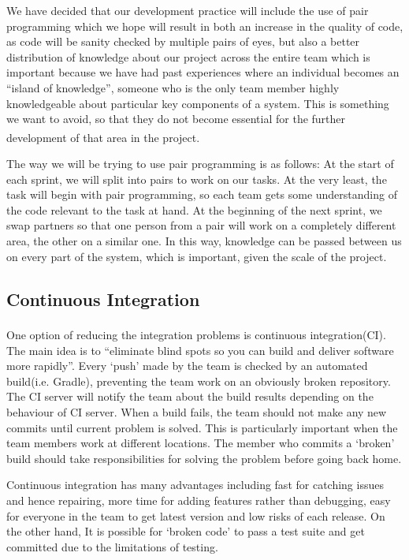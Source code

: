 \documentclass[10pt, a4paper]{article}
\begin{document}
We have decided that our development practice will include the use of pair programming  which we hope will result in both an increase in the quality of code, as code will be sanity checked by multiple pairs of eyes, but also a better distribution of knowledge about our project across the entire team which is important because we have had past experiences where an individual becomes an “island of knowledge”, someone who is the only team member highly knowledgeable about particular key components of a system. This is something we want to avoid, so that they do not become essential for the further development of that area in the project\textsuperscript{\cite{pairprog2}}.

The way we will be trying to use pair programming is as follows:
At the start of each sprint, we will split into pairs to work on our tasks. At the very least, the task will begin with pair programming, so each team gets some understanding of the code relevant to the task at hand. At the beginning of the next sprint, we swap partners so that one person from a pair will work on a completely different area, the other on a similar one. In this way, knowledge can be passed between us on every part of the system, which is important, given the scale of the project.

\subsection{Continuous Integration}

One option of reducing the integration problems is continuous integration(CI)\textsuperscript{\cite{continuous1,continuous2}}. The main idea is to “eliminate blind spots so you can build and deliver software more rapidly”.  Every ‘push’ made by the team is checked by an automated build(i.e. Gradle), preventing the team work on an obviously broken repository. The CI server will notify the team about the build results depending on the behaviour of CI server. When a build fails, the team should not make any new commits until current problem is solved. This is particularly important when the team members work at different locations. The member who commits a ‘broken’ build should take responsibilities for solving the problem before going back home. 

Continuous integration has many advantages including fast for catching  issues and hence repairing, more time for adding features rather than debugging, easy for everyone in the team to get latest version and  low risks of each release. On the other hand, It is possible for ‘broken code’ to pass a test suite and get committed  due to the limitations of testing.
\end{document}
